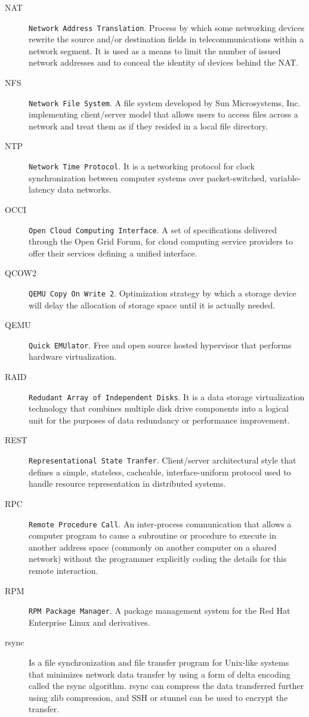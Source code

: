 \begin{description}
\item[NAT] \texttt{Network Address Translation}. Process by which some networking devices rewrite the source and/or destination fields in telecommunications within a network segment. It is used as a means to limit the number of issued network addresses and to conceal the identity of devices behind the NAT.
\item[NFS] \texttt{Network File System}. A file system developed by Sun Microsystems, Inc. implementing client/server model that allows users to access files across a network and treat them as if they resided in a local file directory.
\item[NTP] \texttt{Network Time Protocol}. It is a networking protocol for clock synchronization between computer systems over packet-switched, variable-latency data networks.
\item[OCCI] \texttt{Open Cloud Computing Interface}. A set of specifications delivered through the Open Grid Forum, for cloud computing service providers to offer their services defining a unified interface.
\item[QCOW2] \texttt{QEMU Copy On Write 2}. Optimization strategy by which a storage device will delay the allocation of storage space until it is actually needed.
\item[QEMU] \texttt{Quick EMUlator}. Free and open source hosted hypervisor that performs hardware virtualization.
\item[RAID] \texttt{Redudant Array of Independent Disks}. It is a data storage virtualization technology that combines multiple disk drive components into a logical unit for the purposes of data redundancy or performance improvement.
\item[REST] \texttt{Representational State Tranfer}. Client/server architectural style that defines a simple, stateless, cacheable, interface-uniform protocol used to handle resource representation in distributed systems.
\item[RPC] \texttt{Remote Procedure Call}. An inter-process communication that allows a computer program to cause a subroutine or procedure to execute in another address space (commonly on another computer on a shared network) without the programmer explicitly coding the details for this remote interaction.
\item[RPM] \texttt{RPM Package Manager}. A package management system for the Red Hat Enterprise Linux and derivatives.
\item[rsync] Is a file synchronization and file transfer program for Unix-like systems that minimizes network data transfer by using a form of delta encoding called the rsync algorithm. rsync can compress the data transferred further using zlib compression, and SSH or stunnel can be used to encrypt the transfer.

\end{description}
